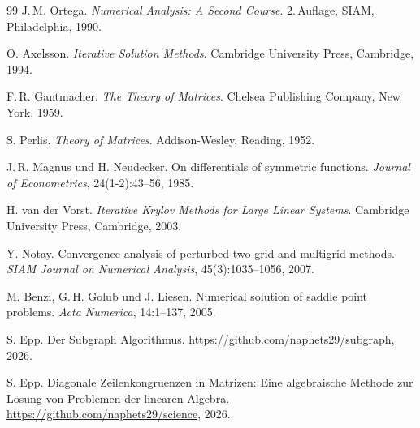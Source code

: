 \documentclass[a4paper,12pt]{article}
\theoremstyle{definition}
\begin{document}
\begin{thebibliography}{99}
J.\,M. Ortega. \textit{Numerical Analysis: A Second Course}. 2.\,Auflage, SIAM, Philadelphia, 1990.

O. Axelsson. \textit{Iterative Solution Methods}. Cambridge University Press, Cambridge, 1994.

F.\,R. Gantmacher. \textit{The Theory of Matrices}. Chelsea Publishing Company, New York, 1959.

S. Perlis. \textit{Theory of Matrices}. Addison-Wesley, Reading, 1952.

J.\,R. Magnus und H. Neudecker. On differentials of symmetric functions. \textit{Journal of Econometrics}, 24(1-2):43--56, 1985.

H. van der Vorst. \textit{Iterative Krylov Methods for Large Linear Systems}. Cambridge University Press, Cambridge, 2003.

Y. Notay. Convergence analysis of perturbed two-grid and multigrid methods. \textit{SIAM Journal on Numerical Analysis}, 45(3):1035--1056, 2007.

M. Benzi, G.\,H. Golub und J. Liesen. Numerical solution of saddle point problems. \textit{Acta Numerica}, 14:1--137, 2005.

S. Epp. Der Subgraph Algorithmus. \url{https://github.com/naphets29/subgraph}, 2026.

S. Epp. Diagonale Zeilenkongruenzen in Matrizen: Eine algebraische Methode zur Lösung von Problemen der linearen Algebra. \url{https://github.com/naphets29/science}, 2026.

\end{thebibliography}
\end{document}
